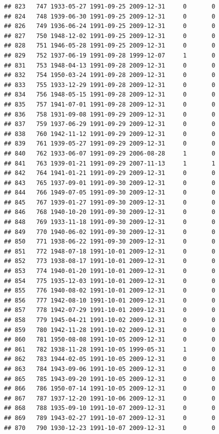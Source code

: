 \documentclass[
]{book}
\begin{document}
\begin{verbatim}
## 823   747 1933-05-27 1991-09-25 2009-12-31     0       0
## 824   748 1939-06-30 1991-09-25 2009-12-31     0       0
## 826   749 1936-06-24 1991-09-25 2009-12-31     0       0
## 827   750 1948-12-02 1991-09-25 2009-12-31     0       0
## 828   751 1946-05-28 1991-09-25 2009-12-31     0       0
## 829   752 1937-06-19 1991-09-28 1999-12-07     1       0
## 831   753 1948-04-13 1991-09-28 2009-12-31     0       0
## 832   754 1950-03-24 1991-09-28 2009-12-31     0       0
## 833   755 1933-12-29 1991-09-28 2009-12-31     0       0
## 834   756 1948-05-15 1991-09-28 2009-12-31     0       0
## 835   757 1941-07-01 1991-09-28 2009-12-31     0       0
## 836   758 1931-09-08 1991-09-29 2009-12-31     0       0
## 837   759 1937-06-29 1991-09-29 2009-12-31     0       0
## 838   760 1942-11-12 1991-09-29 2009-12-31     0       0
## 839   761 1939-05-27 1991-09-29 2009-12-31     0       0
## 840   762 1933-06-07 1991-09-29 2006-08-28     1       0
## 841   763 1939-01-21 1991-09-29 2007-11-13     1       1
## 842   764 1941-01-21 1991-09-29 2009-12-31     0       0
## 843   765 1937-09-01 1991-09-30 2009-12-31     0       0
## 844   766 1949-07-05 1991-09-30 2009-12-31     0       0
## 845   767 1939-01-27 1991-09-30 2009-12-31     0       0
## 846   768 1940-10-20 1991-09-30 2009-12-31     0       0
## 848   769 1933-11-18 1991-09-30 2009-12-31     0       0
## 849   770 1940-06-02 1991-09-30 2009-12-31     0       0
## 850   771 1938-06-22 1991-09-30 2009-12-31     0       0
## 851   772 1948-07-18 1991-10-01 2009-12-31     0       0
## 852   773 1938-08-17 1991-10-01 2009-12-31     0       0
## 853   774 1940-01-20 1991-10-01 2009-12-31     0       0
## 854   775 1935-12-03 1991-10-01 2009-12-31     0       0
## 855   776 1940-08-02 1991-10-01 2009-12-31     0       0
## 856   777 1942-08-10 1991-10-01 2009-12-31     0       0
## 857   778 1942-07-29 1991-10-01 2009-12-31     0       0
## 858   779 1945-04-21 1991-10-02 2009-12-31     0       0
## 859   780 1942-11-28 1991-10-02 2009-12-31     0       0
## 860   781 1950-08-08 1991-10-05 2009-12-31     0       0
## 861   782 1938-11-28 1991-10-05 1999-05-31     1       0
## 862   783 1944-02-05 1991-10-05 2009-12-31     0       0
## 863   784 1943-09-06 1991-10-05 2009-12-31     0       0
## 865   785 1943-09-20 1991-10-05 2009-12-31     0       0
## 866   786 1950-07-14 1991-10-05 2009-12-31     0       0
## 867   787 1937-12-20 1991-10-06 2009-12-31     0       0
## 868   788 1935-09-10 1991-10-07 2009-12-31     0       0
## 869   789 1943-02-27 1991-10-07 2009-12-31     0       0
## 870   790 1930-12-23 1991-10-07 2009-12-31     0       0

\end{verbatim}
\end{document}
